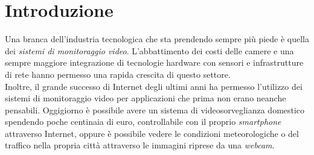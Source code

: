 \chapter{Introduzione}
\label{Introduzione}
\thispagestyle{empty}

Una branca dell'industria tecnologica che sta prendendo sempre pi\`u piede \`e quella dei \textit{sistemi di monitoraggio video}.
L'abbattimento dei costi delle camere e una sempre maggiore integrazione di tecnologie hardware con sensori e infrastrutture di rete hanno permesso una rapida crescita di questo settore.\\
Inoltre, il grande successo di Internet degli ultimi anni ha permesso l'utilizzo dei sistemi di monitoraggio video per applicazioni che prima non erano neanche pensabili.
Oggigiorno \`e possibile avere un sistema di videosorveglianza domestico spendendo poche centinaia di euro, controllabile con il proprio \textit{smartphone} attraverso Internet, oppure \`e possibile vedere le condizioni meteorologiche o del traffico nella propria citt\`a attraverso le immagini riprese da una \textit{webcam}.
